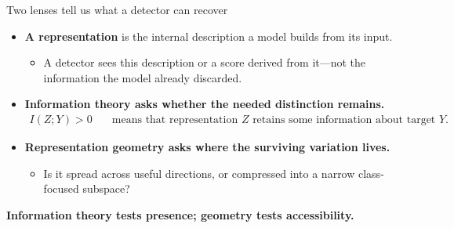 \documentclass[aspectratio=1610]{beamer}
\begin{document}
\begin{frame}{Two lenses tell us what a detector can recover}
\begin{itemize}
  \item \textbf{A representation} is the internal description a model builds from its input.
  \begin{itemize}
    \item A detector sees this description or a score derived from it---not the information the model already discarded.
  \end{itemize}
  \item \textbf{Information theory asks whether the needed distinction remains.}
  \begin{align*}
    I(Z;Y)>0 \quad &\text{means that representation } Z \text{ retains some information about target } Y.
  \end{align*}
  \item \textbf{Representation geometry asks where the surviving variation lives.}
  \begin{itemize}
    \item Is it spread across useful directions, or compressed into a narrow class-focused subspace?
  \end{itemize}
\end{itemize}

\vfill
\begin{center}
  \textbf{Information theory tests presence; geometry tests accessibility.}
\end{center}
\end{frame}
\end{document}
